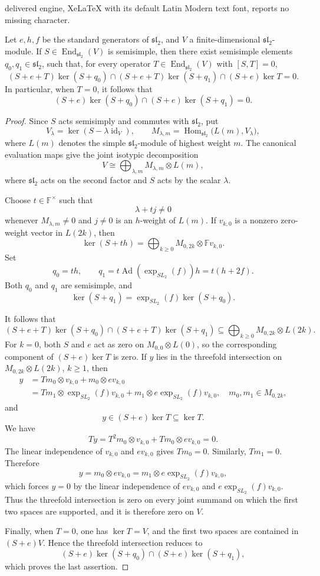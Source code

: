 \documentclass[10pt,a4paper]{amsart}
\newcommand{\Ad}{\operatorname{Ad}}
\newcommand{\F}{\mathbb{F}}
\newcommand{\id}{\operatorname{id}}
\begin{document}
delivered engine, XeLaTeX with its default Latin Modern text font, reports no missing character.
\begin{lemma}\label{lem:sl2-nilpotent-separation}
Let $e,h,f$ be the standard generators of $\mathfrak{sl}_2$,
and $V$ a finite-dimensional $\mathfrak{sl}_2$-module.
If $S\in\operatorname{End}_{\mathfrak{sl}_2}(V)$ is semisimple,
then there exist semisimple elements $q_0,q_1\in\mathfrak{sl}_2$,
such that, for every operator $T\in\operatorname{End}_{\mathfrak{sl}_2}(V)$ with $[S,T]=0$,
\[
(S+e+T)\ker(S+q_0)\cap(S+e+T)\ker(S+q_1)\cap(S+e)\ker T= 0.
\]
In particular, when $T=0$, it follows that
\[
 (S+e)\ker(S+q_0)\cap(S+e)\ker(S+q_1)=0.
\]
\end{lemma}

\begin{proof}
Since \(S\) acts semisimply and commutes with \(\mathfrak{sl}_2\), put
\[
  V_\lambda=\ker(S-\lambda\id_V),
  \qquad
  M_{\lambda,m}=\operatorname{Hom}_{\mathfrak{sl}_2}\bigl(L(m),V_\lambda\bigr),
\]
where \(L(m)\) denotes the simple \(\mathfrak{sl}_2\)-module of highest
weight \(m\).  The canonical evaluation maps give the joint isotypic
decomposition
\[
  V\cong
  \bigoplus_{\lambda,m}M_{\lambda,m}\otimes L(m),
\]
where \(\mathfrak{sl}_2\) acts on the second factor and \(S\) acts by the scalar
\(\lambda\).

Choose \(t\in\F^\times\) such that
\[
  \lambda+tj\ne0
\]
whenever \(M_{\lambda,m}\ne0\) and \(j\ne0\) is an \(h\)-weight of
\(L(m)\).  If \(v_{k,0}\) is a nonzero zero-weight vector in \(L(2k)\),
then
\[
  \ker(S+th)=\bigoplus_{k\ge0} M_{0,2k}\otimes\F v_{k,0}.
\]
Set
\[
  q_0=th,\qquad
  q_1=t\Ad(\exp_{SL_2}(f))h= t(h+2f).
\]
Both \(q_0\) and \(q_1\) are semisimple, and
\[
  \ker(S+q_1)=\exp_{SL_2}(f)\ker(S+q_0).
\]

It follows that
\[
(S+e+T)\ker(S+q_0)\cap (S+e+T)\ker(S+q_1)\subseteq \bigoplus_{k\ge0} M_{0,2k}\otimes L(2k).
\]
For $k=0$, both $S$ and $e$ act as zero on
$M_{0,0}\otimes L(0)$, so the corresponding component of
$(S+e)\ker T$ is zero. If $y$ lies in the threefold intersection on
$M_{0,2k}\otimes L(2k)$, $k\ge 1$, then
\[
\begin{aligned}
 y&=Tm_0\otimes v_{k,0}+m_0\otimes ev_{k,0}\\
  &=Tm_1\otimes \exp_{SL_2}(f)v_{k,0}+m_1\otimes e\exp_{SL_2}(f)v_{k,0}, \quad m_0,m_1\in M_{0,2k},
\end{aligned}
\]
and
\[
 y\in (S+e)\ker T\subseteq\ker T.
\]
We have
\[
Ty= T^2m_0\otimes v_{k,0}+ Tm_0\otimes ev_{k,0}= 0.
\]
The linear independence of $v_{k,0}$ and $ev_{k,0}$ gives \(Tm_0=0\).
Similarly, \(Tm_1=0\). Therefore
\[
 y=m_0\otimes ev_{k,0}
  =m_1\otimes e\exp_{SL_2}(f)v_{k,0},
\]
which forces $y=0$ by the linear independence of $ev_{k,0}$ and $e\exp_{SL_2}(f)v_{k,0}$.
Thus the threefold intersection is zero on every joint summand on
which the first two spaces are supported, and it is therefore zero on $V$.

Finally, when $T=0$, one has $\ker T=V$, and the first two spaces
are contained in $(S+e)V$. Hence the threefold intersection reduces
to
\[
 (S+e)\ker(S+q_0)\cap(S+e)\ker(S+q_1),
\]
which proves the last assertion.
\end{proof}
\end{document}
